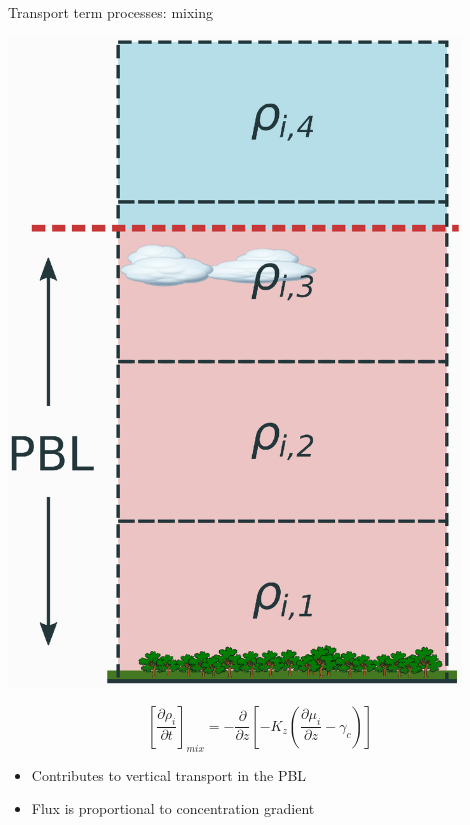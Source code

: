 \documentclass[10pt]{beamer}
\begin{document}
\begin{frame}[fragile]{Transport term processes: mixing}
    \begin{minipage}[c]{0.39\textwidth}
        \begin{center}
            \includegraphics[width=0.9\textwidth]{box-model-mixing.eps}
        \end{center}
        \vspace{5mm}
        \footnotesize
        $$
            \left[ \frac{\partial \rho_i}{\partial t} \right]_{mix} = -\frac{\partial}{\partial z} \left[-K_z \left(\frac{\partial \mu_i}{\partial z} - \gamma_c \right)\right]
        $$
    \end{minipage} \hfill
    \begin{minipage}[c]{0.6\textwidth}
        \small
        \begin{itemize}
            \item Contributes to vertical transport in the PBL
            \item Flux is proportional to concentration gradient

\end{itemize}
\end{minipage}
\end{frame}
\end{document}
